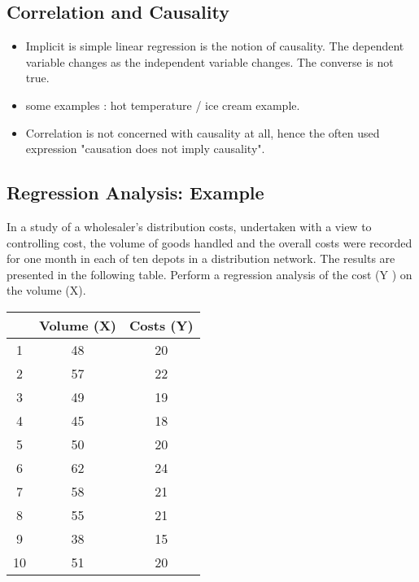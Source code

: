 \documentclass[]{report}
\begin{document}
\subsection{Correlation and Causality }
\begin{itemize}
	\item Implicit is simple linear regression is the notion of causality. The dependent variable changes as the independent variable changes. The converse is not true.
	
\item some examples : hot temperature / ice cream example.
	
\item Correlation is not concerned with causality at all, hence the often used expression "causation does not imply causality".
	
\end{itemize}





\subsection{Regression Analysis: Example}
In a study of a wholesaler’s distribution costs, undertaken with a view to controlling cost, the volume of goods handled and the overall costs were recorded for one month in each of ten depots in a distribution network. The results are presented in the following table. Perform a regression analysis of the cost (Y ) on the volume (X).

\begin{center}
	
	\begin{tabular}{|c|c|c|}\hline
		&  Volume (X)   &  Costs (Y) \\ \hline
		1     &     48     &   20 \\
		2     &    57      &   22 \\
		3     &    49      &   19 \\
		4     &    45      &   18 \\
		5     &    50      &   20 \\
		6     &    62      &   24 \\
		7     &    58      &   21 \\
		8     &    55      &   21 \\
		9     &    38      &   15 \\
		10    &    51      &  20 \\ \hline
	\end{tabular}
\end{center}
\end{document}
